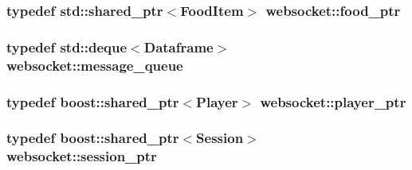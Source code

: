 \subsubsection[{\texorpdfstring{food\+\_\+ptr}{food_ptr}}]{\setlength{\rightskip}{0pt plus 5cm}typedef std\+::shared\+\_\+ptr$<${\bf Food\+Item}$>$ {\bf websocket\+::food\+\_\+ptr}}\hypertarget{namespacewebsocket_a198017789b8c5fa32315a12d5ce97869}{}\label{namespacewebsocket_a198017789b8c5fa32315a12d5ce97869}
\subsubsection[{\texorpdfstring{message\+\_\+queue}{message_queue}}]{\setlength{\rightskip}{0pt plus 5cm}typedef std\+::deque$<${\bf Dataframe}$>$ {\bf websocket\+::message\+\_\+queue}}\hypertarget{namespacewebsocket_ae3fdf29bb367b5baf5be703253a4edfa}{}\label{namespacewebsocket_ae3fdf29bb367b5baf5be703253a4edfa}
\subsubsection[{\texorpdfstring{player\+\_\+ptr}{player_ptr}}]{\setlength{\rightskip}{0pt plus 5cm}typedef boost\+::shared\+\_\+ptr$<${\bf Player}$>$ {\bf websocket\+::player\+\_\+ptr}}\hypertarget{namespacewebsocket_aec8d52893bdf524a1412533a63b006a3}{}\label{namespacewebsocket_aec8d52893bdf524a1412533a63b006a3}
\subsubsection[{\texorpdfstring{session\+\_\+ptr}{session_ptr}}]{\setlength{\rightskip}{0pt plus 5cm}typedef boost\+::shared\+\_\+ptr$<${\bf Session}$>$ {\bf websocket\+::session\+\_\+ptr}}\hypertarget{namespacewebsocket_a12d8500a66e77dc9bfbff046b86714d8}{}\label{namespacewebsocket_a12d8500a66e77dc9bfbff046b86714d8}
